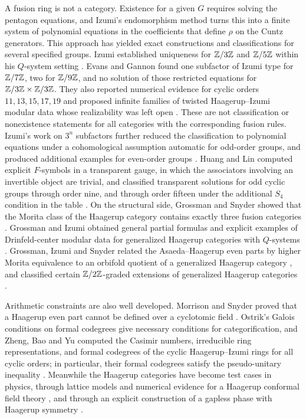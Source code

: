 A fusion ring is not a category. Existence for a given $G$ requires
solving the pentagon equations, and Izumi's endomorphism method turns
this into a finite system of polynomial equations in the coefficients
that define $\rho$ on the Cuntz generators. This approach has yielded
exact constructions and classifications for several specified groups.
Izumi established uniqueness for $\mathbb Z/3\mathbb Z$ and $\mathbb Z/5\mathbb Z$ within his
$Q$-system setting \cite{Izumi2}. Evans and Gannon found one subfactor
of Izumi type for $\mathbb Z/7\mathbb Z$, two for $\mathbb Z/9\mathbb Z$, and no solution of
those restricted equations for $\mathbb Z/3\mathbb Z\times\mathbb Z/3\mathbb Z$. They also
reported numerical evidence for cyclic orders $11,13,15,17,19$ and
proposed infinite families of twisted Haagerup--Izumi modular data
whose realizability was left open \cite{EG2011}. These are not
classification or nonexistence statements for all categories with the
corresponding fusion rules. Izumi's work on $3^n$ subfactors further
reduced the classification to polynomial equations under a
cohomological assumption automatic for odd-order groups, and produced
additional examples for even-order groups \cite{Izumi2018}.
Huang and Lin computed explicit $F$-symbols in a transparent gauge, in
which the associators involving an invertible object are trivial, and
classified transparent solutions for odd cyclic groups through order
nine, and through order fifteen under the additional $S_4$ condition
in the table \cite{HL}. On the structural side, Grossman and Snyder showed
that the Morita class of the Haagerup category contains exactly three
fusion categories \cite{GS}. Grossman and Izumi obtained general
partial formulas and explicit examples of Drinfeld-center modular data
for generalized Haagerup categories with $Q$-systems \cite{GI}.
Grossman, Izumi and Snyder related the Asaeda--Haagerup even parts by
higher Morita equivalence to an orbifold quotient of a generalized
Haagerup category \cite{GIS}, and classified certain
$\mathbb Z/2\mathbb Z$-graded extensions of generalized Haagerup categories
\cite{GIS2}.

Arithmetic constraints are also well developed. Morrison and Snyder
proved that a Haagerup even part cannot be defined over a cyclotomic
field \cite{MS}. Ostrik's Galois conditions on formal codegrees
\cite{OstrikFC} give necessary conditions for categorification, and
Zheng, Bao and Yu computed the Casimir numbers, irreducible ring
representations, and formal codegrees of the cyclic Haagerup--Izumi rings
for all cyclic orders; in particular, their formal codegrees satisfy
the pseudo-unitary inequality \cite{ZBY}. Meanwhile the Haagerup categories
have become test cases in physics, through lattice models and numerical
evidence for a Haagerup conformal field theory \cite{HLOTT,Vanhove},
and through an explicit construction of a gapless phase with Haagerup
symmetry \cite{Bottini}.



